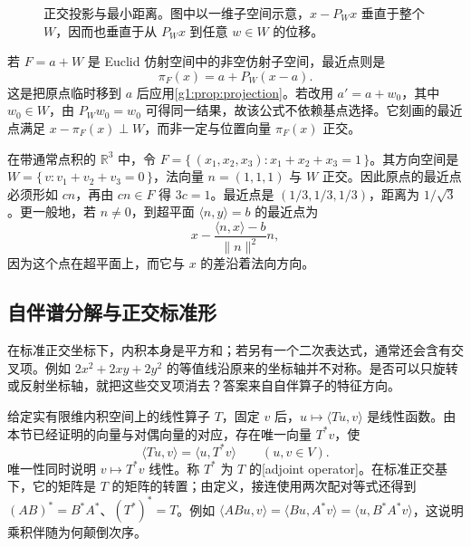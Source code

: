 \begin{figure}[htbp]
	\centering
	
	\caption[正交投影与最小距离]{正交投影与最小距离。图中以一维子空间示意，\(x-P_Wx\) 垂直于整个 \(W\)，因而也垂直于从 \(P_Wx\) 到任意 \(w\in W\) 的位移。}
	\label{g1:fig:orthogonal-projection}
\end{figure}

若 \(F=a+W\) 是 Euclid 仿射空间中的非空仿射子空间，最近点则是
\[
	\pi_F(x)=a+P_W(x-a).
\]
这是把原点临时移到 \(a\) 后应用\cref{g1:prop:projection}。若改用 \(a'=a+w_0\)，其中 \(w_0\in W\)，由 \(P_Ww_0=w_0\) 可得同一结果，故该公式不依赖基点选择。它刻画的最近点满足 \(x-\pi_F(x)\perp W\)，而非一定与位置向量 \(\pi_F(x)\) 正交。

\begin{example}
	\label{g1:exm:plane-projection}
	在带通常点积的 \(\mathbb R^3\) 中，令 \(F=\{\,(x_1,x_2,x_3):x_1+x_2+x_3=1\,\}\)。其方向空间是 \(W=\{\,v:v_1+v_2+v_3=0\,\}\)，法向量 \(n=(1,1,1)\) 与 \(W\) 正交。因此原点的最近点必须形如 \(cn\)，再由 \(cn\in F\) 得 \(3c=1\)。最近点是 \((1/3,1/3,1/3)\)，距离为 \(1/\sqrt3\)。更一般地，若 \(n\ne0\)，到超平面 \(\langle n,y\rangle=b\) 的最近点为
	\[
		x-\frac{\langle n,x\rangle-b}{\lVert n\rVert^2}n,
	\]
	因为这个点在超平面上，而它与 \(x\) 的差沿着法向方向。
\end{example}

\subsection{自伴谱分解与正交标准形}
\label{g1:subsec:0102:02}

在标准正交坐标下，内积本身是平方和；若另有一个二次表达式，通常还会含有交叉项。例如 \(2x^2+2xy+2y^2\) 的等值线沿原来的坐标轴并不对称。是否可以只旋转或反射坐标轴，就把这些交叉项消去？答案来自自伴算子的特征方向。

\ProseParagraphBreak

给定实有限维内积空间上的线性算子 \(T\)，固定 \(v\) 后，\(u\mapsto\langle Tu,v\rangle\) 是线性函数。由本节已经证明的向量与对偶向量的对应，存在唯一向量 \(T^*v\)，使
\[
	\langle Tu,v\rangle=\langle u,T^*v\rangle\qquad(u,v\in V).
\]
唯一性同时说明 \(v\mapsto T^*v\) 线性。称 \(T^*\) 为 \(T\) 的[adjoint operator]。在标准正交基下，它的矩阵是 \(T\) 的矩阵的转置；由定义，接连使用两次配对等式还得到 \((AB)^*=B^*A^*\)、\((T^*)^*=T\)。例如 \(\langle ABu,v\rangle=\langle Bu,A^*v\rangle=\langle u,B^*A^*v\rangle\)，这说明乘积伴随为何颠倒次序。


